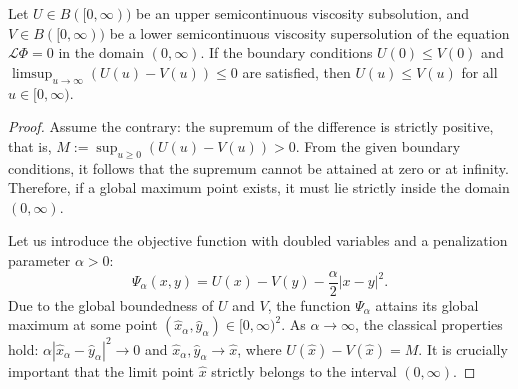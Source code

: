 \documentclass[smallextended]{svjour3}
\begin{document}
\begin{theorem}
\label{thm:comparison}
Let $U \in B([0, \infty))$ be an upper semicontinuous viscosity subsolution, and $V \in B([0, \infty))$ be a lower semicontinuous viscosity supersolution of the equation $\mathcal{L} \Phi = 0$ in the domain $(0, \infty)$. If the boundary conditions $U(0) \le V(0)$ and $\limsup_{u \to \infty} (U(u) - V(u)) \le 0$ are satisfied, then $U(u) \le V(u)$ for all $u \in[0, \infty)$.
\end{theorem}

\begin{proof}
Assume the contrary: the supremum of the difference is strictly positive, that is, $M := \sup_{u \ge 0} (U(u) - V(u)) > 0$. From the given boundary conditions, it follows that the supremum cannot be attained at zero or at infinity. Therefore, if a global maximum point exists, it must lie strictly inside the domain $(0, \infty)$.

Let us introduce the objective function with doubled variables and a penalization parameter $\alpha > 0$:
$$ \Psi_\alpha(x, y) = U(x) - V(y) - \frac{\alpha}{2}|x - y|^2. $$
Due to the global boundedness of $U$ and $V$, the function $\Psi_\alpha$ attains its global maximum at some point $(\hat{x}_\alpha, \hat{y}_\alpha) \in[0, \infty)^2$. As $\alpha \to \infty$, the classical properties hold: $\alpha |\hat{x}_\alpha - \hat{y}_\alpha|^2 \to 0$ and $\hat{x}_\alpha, \hat{y}_\alpha \to \hat{x}$, where $U(\hat{x}) - V(\hat{x}) = M$. It is crucially important that the limit point $\hat{x}$ strictly belongs to the interval $(0, \infty)$.


\end{proof}
\end{document}
